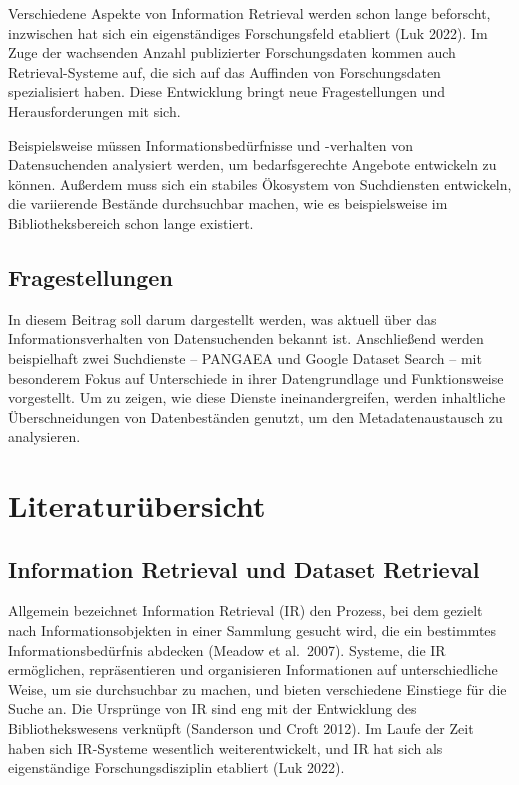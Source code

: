 \documentclass[a4paper,
fontsize=11pt,
oneside,
numbers=noperiodatend,
parskip=half-,
bibliography=totoc,
final
]{scrartcl}
\begin{document}
Verschiedene Aspekte von Information Retrieval werden schon lange
beforscht, inzwischen hat sich ein eigenständiges Forschungsfeld
etabliert (Luk 2022). Im Zuge der wachsenden Anzahl publizierter
Forschungsdaten kommen auch Retrieval-Systeme auf, die sich auf das
Auffinden von Forschungsdaten spezialisiert haben. Diese Entwicklung
bringt neue Fragestellungen und Herausforderungen mit sich.

Beispielsweise müssen Informationsbedürfnisse und -verhalten von
Datensuchenden analysiert werden, um bedarfsgerechte Angebote entwickeln
zu können. Außerdem muss sich ein stabiles Ökosystem von Suchdiensten
entwickeln, die variierende Bestände durchsuchbar machen, wie es
beispielsweise im Bibliotheksbereich schon lange existiert.

\hypertarget{fragestellungen}{%
\subsection{Fragestellungen}\label{fragestellungen}}

In diesem Beitrag soll darum dargestellt werden, was aktuell über das
Informationsverhalten von Datensuchenden bekannt ist. Anschließend
werden beispielhaft zwei Suchdienste -- PANGAEA und Google Dataset
Search -- mit besonderem Fokus auf Unterschiede in ihrer Datengrundlage
und Funktionsweise vorgestellt. Um zu zeigen, wie diese Dienste
ineinandergreifen, werden inhaltliche Überschneidungen von
Datenbeständen genutzt, um den Metadatenaustausch zu analysieren.

\hypertarget{literaturuxfcbersicht}{%
\section{Literaturübersicht}\label{literaturuxfcbersicht}}

\hypertarget{information-retrieval-und-dataset-retrieval}{%
\subsection{Information Retrieval und Dataset
Retrieval}\label{information-retrieval-und-dataset-retrieval}}

Allgemein bezeichnet Information Retrieval (IR) den Prozess, bei dem
gezielt nach Informationsobjekten in einer Sammlung gesucht wird, die
ein bestimmtes Informationsbedürfnis abdecken (Meadow et al.~2007).
Systeme, die IR ermöglichen, repräsentieren und organisieren
Informationen auf unterschiedliche Weise, um sie durchsuchbar zu machen,
und bieten verschiedene Einstiege für die Suche an. Die Ursprünge von IR
sind eng mit der Entwicklung des Bibliothekswesens verknüpft (Sanderson
und Croft 2012). Im Laufe der Zeit haben sich IR-Systeme wesentlich
weiterentwickelt, und IR hat sich als eigenständige Forschungsdisziplin
etabliert (Luk 2022).
\end{document}
